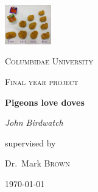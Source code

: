 \documentclass[12pt, a4paper]{report}
\begin{document}
\begin{titlepage}
    \centering
    \includegraphics[width=0.15\textwidth]{./pic/v2.jpg} \par
    \vspace{1cm}
    {\scshape \LARGE Columbidae University \par}
    \vspace{1cm}
    {\scshape \LARGE Final year project \par}
    \vspace{1.5cm}
    {\huge \bfseries Pigeons love doves \par}
    \vspace{2cm}
    {\Large \itshape John Birdwatch \par}
    \vfill
    supervised by \par
    Dr.~Mark \textsc{Brown}

    \vfill

    {\large \today \par}

\end{titlepage}
\end{document}
